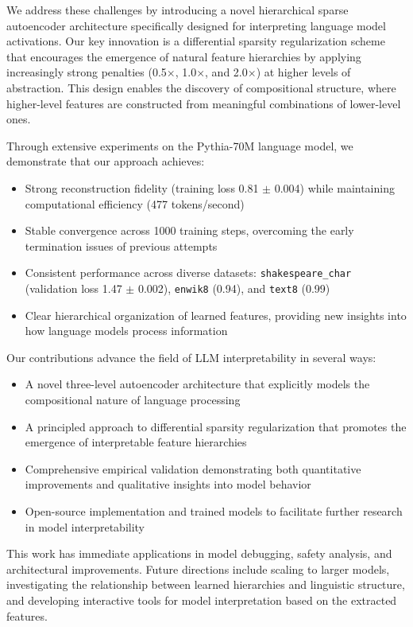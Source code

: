 We address these challenges by introducing a novel hierarchical sparse autoencoder architecture specifically designed for interpreting language model activations. Our key innovation is a differential sparsity regularization scheme that encourages the emergence of natural feature hierarchies by applying increasingly strong penalties (0.5$\times$, 1.0$\times$, and 2.0$\times$) at higher levels of abstraction. This design enables the discovery of compositional structure, where higher-level features are constructed from meaningful combinations of lower-level ones.

Through extensive experiments on the Pythia-70M language model, we demonstrate that our approach achieves:
\begin{itemize}
    \item Strong reconstruction fidelity (training loss 0.81 $\pm$ 0.004) while maintaining computational efficiency (477 tokens/second)
    \item Stable convergence across 1000 training steps, overcoming the early termination issues of previous attempts
    \item Consistent performance across diverse datasets: \texttt{shakespeare\_char} (validation loss 1.47 $\pm$ 0.002), \texttt{enwik8} (0.94), and \texttt{text8} (0.99)
    \item Clear hierarchical organization of learned features, providing new insights into how language models process information
\end{itemize}

Our contributions advance the field of LLM interpretability in several ways:
\begin{itemize}
    \item A novel three-level autoencoder architecture that explicitly models the compositional nature of language processing
    \item A principled approach to differential sparsity regularization that promotes the emergence of interpretable feature hierarchies
    \item Comprehensive empirical validation demonstrating both quantitative improvements and qualitative insights into model behavior
    \item Open-source implementation and trained models to facilitate further research in model interpretability
\end{itemize}

This work has immediate applications in model debugging, safety analysis, and architectural improvements. Future directions include scaling to larger models, investigating the relationship between learned hierarchies and linguistic structure, and developing interactive tools for model interpretation based on the extracted features.

